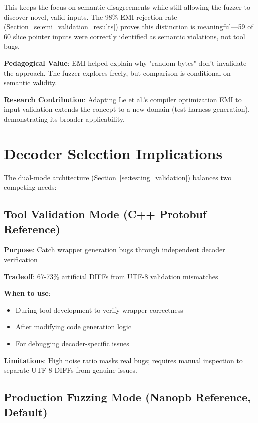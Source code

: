 \documentclass[doublespace,nopageskip]{VTthesis}
\begin{document}
This keeps the focus on semantic disagreements while still allowing the fuzzer to discover novel, valid inputs. The 98\% EMI rejection rate (Section~\ref{se:emi_validation_results}) proves this distinction is meaningful---59 of 60 slice pointer inputs were correctly identified as semantic violations, not tool bugs.

\textbf{Pedagogical Value}: EMI helped explain why "random bytes" don't invalidate the approach. The fuzzer explores freely, but comparison is conditional on semantic validity.

\textbf{Research Contribution}: Adapting Le et al.'s compiler optimization EMI to input validation extends the concept to a new domain (test harness generation), demonstrating its broader applicability.

\section{Decoder Selection Implications} \label{se:decoder_selection_implications}

The dual-mode architecture (Section~\ref{se:testing_validation}) balances two competing needs:

\subsection{Tool Validation Mode (C++ Protobuf Reference)}

\textbf{Purpose}: Catch wrapper generation bugs through independent decoder verification

\textbf{Tradeoff}: 67-73\% artificial DIFFs from UTF-8 validation mismatches

\textbf{When to use}:
\begin{itemize}
    \item During tool development to verify wrapper correctness
    \item After modifying code generation logic
    \item For debugging decoder-specific issues
\end{itemize}

\textbf{Limitations}: High noise ratio masks real bugs; requires manual inspection to separate UTF-8 DIFFs from genuine issues.

\subsection{Production Fuzzing Mode (Nanopb Reference, Default)}
\end{document}
